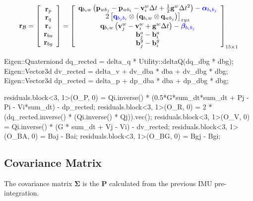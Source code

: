 \documentclass[12pt]{report}   %
\begin{document}
\begin{equation}
\label{equ:residual_imu_q}
\mathbf{r}_{\mathcal{B}}
=
\left[\begin{array}{c}
{\mathbf{r}_{p}} \\ 
{\mathbf{r}_{q}} \\ 
{\mathbf{r}_{v}} \\ 
{\mathbf{r}_{b a}} \\ 
{\mathbf{r}_{b g}}
\end{array}\right]
=
\left[\begin{array}{c}
{\mathbf{q}_{b_{i} w}\left(\mathbf{p}_{w b_{j}}-\mathbf{p}_{w b_{i}}-\mathbf{v}_{i}^{w} \Delta t+\frac{1}{2} \mathbf{g}^{w} \Delta t^{2}\right)-{\color{blue}\boldsymbol{\alpha}_{b_{i} b_{j}}}} \\ 
{2\left[{\color{blue}\mathbf{q}_{b_{j} b_{i}}} \otimes\left(\mathbf{q}_{b_{i} w} \otimes \mathbf{q}_{w b_{j}}\right)\right]_{xyz}} \\ 
{\mathbf{q}_{b_{i} w}\left(\mathbf{v}_{j}^{w}-\mathbf{v}_{i}^{w}+\mathbf{g}^{w} \Delta t\right)-{\color{blue}\boldsymbol{\beta}_{b_{i} b_{j}}}} \\ 
{\mathbf{b}_{j}^{a}-\mathbf{b}_{i}^{a}} \\ 
{\mathbf{b}_{j}^{g}-\mathbf{b}_{i}^{g}}
\end{array}\right]_{15 \times 1}
\end{equation}

\begin{cppcode}
Eigen::Quaterniond dq_rected = delta_q * Utility::deltaQ(dq_dbg * dbg);
Eigen::Vector3d    dv_rected = delta_v + dv_dba * dba + dv_dbg * dbg;
Eigen::Vector3d    dp_rected = delta_p + dp_dba * dba + dp_dbg * dbg;

residuals.block<3, 1>(O_P, 0)  = 
Qi.inverse() * (0.5*G*sum_dt*sum_dt + Pj - Pi - Vi*sum_dt) - dp_rected;
residuals.block<3, 1>(O_R, 0)  = 
2 * (dq_rected.inverse() * (Qi.inverse() * Qj)).vec();
residuals.block<3, 1>(O_V, 0)  = 
Qi.inverse() * (G * sum_dt + Vj - Vi) - dv_rected;
residuals.block<3, 1>(O_BA, 0) = Baj - Bai;
residuals.block<3, 1>(O_BG, 0) = Bgj - Bgi;
\end{cppcode}

\subsection{Covariance Matrix}

The covariance matrix $\boldsymbol{\Sigma}$ is the $\mathbf{P}$ calculated from the previous IMU pre-integration. 
\end{document}

